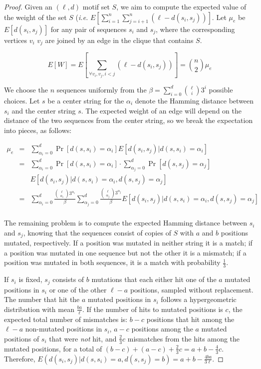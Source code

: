 \begin{proof} Given an $(\ell, d)$ motif set $S$, we aim to compute the expected value of the weight of the set $S$ ({\em i.e.} $E[\sum_{i=1}^{n}\sum_{j=i+1}^{n}(\ell - d(s_i,s_j))]$.  Let $\mu_e$ be $E[d(s_i,s_j)]$ for any pair of sequences $s_i$ and $s_j$, where the corresponding vertices $v_i$ $v_j$ are joined by an edge in the clique that contains $S$.

\[ E \left[ W \right] =  E \left[ \sum_{\forall v_i, v_j, i < j} (\ell - d(s_i, s_j)) \right] = {n \choose 2} \mu_e \]
 
We choose the $n$ sequences uniformly from the $\beta = \sum_{i = 0}^{d} {{\ell} \choose i} 3^i$ possible choices. Let $s$ be a center string for the $\alpha_i$ denote the Hamming distance between $s_i$ and the center string $s$.  The expected weight of an edge will depend on the distance of the two sequences from the center string, so we break the expectation into pieces, as follows:

\begin{center}
\begin{math}	
\begin{array}{lll}
\mu_e  	& = & \sum_{\alpha_i = 0}^{d}\Pr[d(s, s_i) = \alpha_i ] E[d(s_i,s_j)| d(s, s_i) =\alpha_i ] \\
					& = & \sum_{\alpha_i = 0}^{d}\Pr[d(s, s_i) = \alpha_i ] \cdot  \sum_{\alpha_j=0}^{d}\Pr[d(s, s_j) = \alpha_j ]  \\
                    & ~  &  E[d(s_i,s_j)|d (s, s_i ) = \alpha_i, d (s, s_j ) = \alpha_j ] \\
					& = & \sum_{\alpha_i = 0}^{d}\frac{ {{\ell} \choose {\alpha_i}}3^{\alpha_i}}{\beta}\sum_{\alpha_j=0}^{d}\frac{{{\ell} \choose {\alpha_j}}3^{\alpha_j}}{\beta}E[d(s_i,s_j)|d (s, s_i ) = \alpha_i, d(s, s_j ) = \alpha_j ] \\
\end{array}
\end{math}
\end{center}	

The remaining problem is to compute the expected Hamming distance between $s_i$ and $s_j$, knowing that the sequences consist of copies of $S$ with $a$ and $b$ positions mutated, respectively. If a position was mutated in neither string it is a match; if a position was mutated in one sequence but not the other it is a mismatch; if a position was mutated in both sequences, it is a match with probability $\frac{1}{3}$.

If $s_i$ is fixed, $s_j$ consists of $b$ mutations that each either hit one of the $a$ mutated positions in $s_i$ or one of the other $\ell - a$ positions, sampled without replacement. The number that hit the $a$ mutated positions in $s_i$ follows a hypergeometric distribution with mean $\frac{ba}{\ell}$. If the number of hits to mutated positions is $c$, the expected total number of mismatches is: $b-c$ positions that hit among the $\ell-a$ non-mutated positions in $s_i$, $a-c$ positions among the $a$ mutated positions of $s_i$ that were \emph{not} hit, and $\frac{2}{3}c$ mismatches from the hits among the mutated positions, for a total of $(b-c)+(a-c)+\frac{2}{3}c = a+b-\frac{4}{3}c$. Therefore, $E(d(s_i,s_j)|d(s,s_i)=a, d(s,s_j)=b) = a+b-\frac{4ba}{3\ell}$. 


\end{proof}
